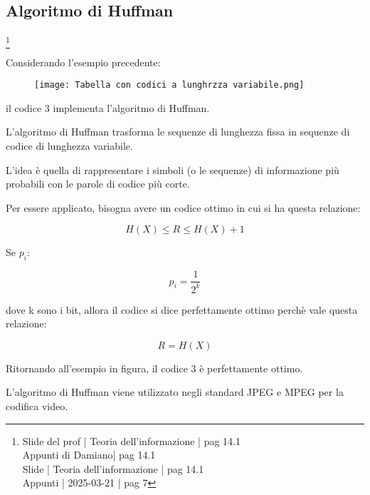 \newpage 

\subsection{Algoritmo di Huffman}
\footnote{Slide del prof | Teoria dell'informazione | pag 14.1 \\  
Appunti di Damiano| pag 14.1 \\
Slide | Teoria dell'informazione | pag 14.1 \\
Appunti | 2025-03-21 | pag 7
}

Considerando l'esempio precedente: 

\begin{figure}[h]
    \centering
    \texttt{[image: Tabella con codici a lunghrzza variabile.png]}
\end{figure} 

il codice 3 implementa l'algoritmo di Huffman. \newline 

L'algoritmo di Huffman trasforma le sequenze di lunghezza fissa in sequenze di codice di lunghezza variabile. \newline 

L'idea è quella di rappresentare i simboli (o le sequenze) di informazione più probabili con le parole di codice più corte. \newline 

Per essere applicato, bisogna avere un codice ottimo in cui si ha questa relazione: 

{
    \Large
    \begin{equation}
        H (X) \le R \le H(X) + 1
    \end{equation}
}

Se $p_i$: 

{
    \Large 
    \begin{equation}
        p_i = \frac{1}{2^{k}}
    \end{equation}
}

dove k sono i bit, allora il codice si dice perfettamente ottimo perchè vale questa relazione: 

{
    \Large 
    \begin{equation}
        R = H(X)
    \end{equation}
}

Ritornando all'esempio in figura, il codice 3 è perfettamente ottimo. \newline 

L'algoritmo di Huffman viene utilizzato negli standard JPEG e MPEG per la codifica video. \newline 

